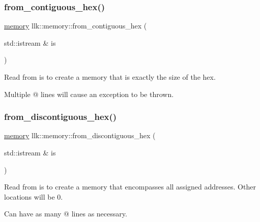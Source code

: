 \mbox{\label{classllk_1_1memory_a21247daa4aa05ac0e4841c7771e68feb}} 
\subsubsection{\texorpdfstring{from\+\_\+contiguous\+\_\+hex()}{from\_contiguous\_hex()}}
{\footnotesize\ttfamily \hyperlink{classllk_1_1memory}{memory} llk\+::memory\+::from\+\_\+contiguous\+\_\+hex (\begin{DoxyParamCaption}\item[{std\+::istream \&}]{is }\end{DoxyParamCaption})\hspace{0.3cm}{\ttfamily [static]}}



Read from {\ttfamily is} to create a memory that is exactly the size of the hex. 

Multiple @ lines will cause an exception to be thrown. \mbox{\label{classllk_1_1memory_a86fbd7265d551f2e18e943028d2b8728}} 
\subsubsection{\texorpdfstring{from\+\_\+discontiguous\+\_\+hex()}{from\_discontiguous\_hex()}}
{\footnotesize\ttfamily \hyperlink{classllk_1_1memory}{memory} llk\+::memory\+::from\+\_\+discontiguous\+\_\+hex (\begin{DoxyParamCaption}\item[{std\+::istream \&}]{is }\end{DoxyParamCaption})\hspace{0.3cm}{\ttfamily [static]}}



Read from {\ttfamily is} to create a memory that encompasses all assigned addresses. Other locations will be 0. 

Can have as many @ lines as necessary. \mbox{\label{classllk_1_1memory_a81eb269512a86baf7e9cd560e44e0d41}} 
